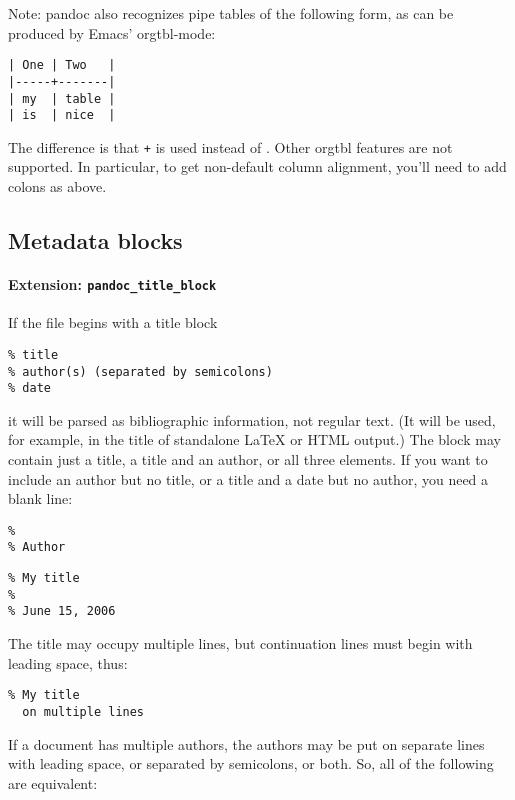 \documentclass[
]{article}
\begin{document}
Note: pandoc also recognizes pipe tables of the following form, as can
be produced by Emacs' orgtbl-mode:

\begin{verbatim}
| One | Two   |
|-----+-------|
| my  | table |
| is  | nice  |
\end{verbatim}

The difference is that \texttt{+} is used instead of
\texttt{\textbar{}}. Other orgtbl features are not supported. In
particular, to get non-default column alignment, you'll need to add
colons as above.

\subsection{Metadata blocks}\label{metadata-blocks}

\paragraph{\texorpdfstring{Extension:
\texttt{pandoc\_title\_block}}{Extension: pandoc\_title\_block}}\label{extension-pandoc_title_block}

If the file begins with a title block

\begin{verbatim}
% title
% author(s) (separated by semicolons)
% date
\end{verbatim}

it will be parsed as bibliographic information, not regular text. (It
will be used, for example, in the title of standalone LaTeX or HTML
output.) The block may contain just a title, a title and an author, or
all three elements. If you want to include an author but no title, or a
title and a date but no author, you need a blank line:

\begin{verbatim}
%
% Author
\end{verbatim}

\begin{verbatim}
% My title
%
% June 15, 2006
\end{verbatim}

The title may occupy multiple lines, but continuation lines must begin
with leading space, thus:

\begin{verbatim}
% My title
  on multiple lines
\end{verbatim}

If a document has multiple authors, the authors may be put on separate
lines with leading space, or separated by semicolons, or both. So, all
of the following are equivalent:
\end{document}
